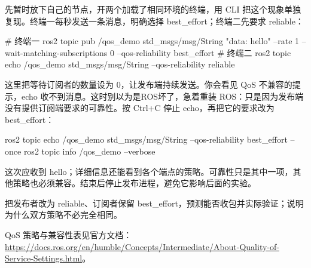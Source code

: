\begin{example}
先暂时放下自己的节点，开两个加载了相同环境的终端，用 CLI 把这个现象单独复现。终端一每秒发送一条消息，明确选择 best\_effort；终端二先要求 reliable：
\par\medskip\noindent\begin{minipage}{\linewidth}
\begin{tbash}
# 终端一
ros2 topic pub /qos_demo std_msgs/msg/String "{data: hello}" --rate 1 --wait-matching-subscriptions 0 --qos-reliability best_effort
# 终端二
ros2 topic echo /qos_demo std_msgs/msg/String --qos-reliability reliable
\end{tbash}
\end{minipage}\par\smallskip
这里把等待订阅者的数量设为 0，让发布端持续发送。你会看见 QoS 不兼容的提示，echo 收不到消息。这时别以为是ROS坏了，急着重装 ROS：只是因为发布端没有提供订阅端要求的可靠性。按 Ctrl+C 停止 echo，再把它的要求改为 best\_effort：
\par\medskip\noindent\begin{minipage}{\linewidth}
\begin{tbash}
ros2 topic echo /qos_demo std_msgs/msg/String --qos-reliability best_effort --once
ros2 topic info /qos_demo --verbose
\end{tbash}
\end{minipage}\par\smallskip
这次应收到 hello；详细信息还能看到各个端点的策略。可靠性只是其中一项，其他策略也必须兼容。结束后停止发布进程，避免它影响后面的实验。
\end{example}
\begin{exercise}
\label{ex:v2-ros-qos}
把发布者改为 reliable、订阅者保留 best\_effort，预测能否收包并实际验证；说明为什么双方策略不必完全相同。
\end{exercise}
\begin{note}
QoS 策略与兼容性表见官方文档：\url{https://docs.ros.org/en/humble/Concepts/Intermediate/About-Quality-of-Service-Settings.html}。
\end{note}

